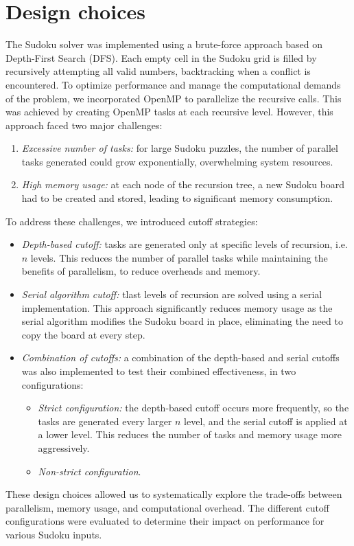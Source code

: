 \documentclass[paper=a4, fontsize=12pt]{scrartcl}
\numberwithin{equation}{section}
\numberwithin{figure}{section}
\numberwithin{table}{section}
\begin{document}
    \section{Design choices}
    The Sudoku solver was implemented using a brute-force approach based on Depth-First Search (DFS). 
    Each empty cell in the Sudoku grid is filled by recursively attempting all valid numbers, backtracking when a conflict is encountered.
    To optimize performance and manage the computational demands of the problem, we incorporated OpenMP to parallelize the recursive calls. 
    This was achieved by creating OpenMP tasks at each recursive level. 
    However, this approach faced two major challenges:
    \begin{enumerate}
        \item \textit{Excessive number of tasks:} for large Sudoku puzzles, the number of parallel tasks generated could grow exponentially, overwhelming system resources.
        \item \textit{High memory usage:} at each node of the recursion tree, a new Sudoku board had to be created and stored, leading to significant memory consumption.
    \end{enumerate}
    \noindent To address these challenges, we introduced cutoff strategies:
    \begin{itemize}
        \item \textit{Depth-based cutoff:} tasks are generated only at specific levels of recursion, i.e. $n$ levels. 
            This reduces the number of parallel tasks while maintaining the benefits of parallelism, to reduce overheads and memory.
        \item \textit{Serial algorithm cutoff:} tlast levels of recursion are solved using a serial implementation. 
            This approach significantly reduces memory usage as the serial algorithm modifies the Sudoku board in place, eliminating the need to copy the board at every step.
        \item \textit{Combination of cutoffs:} a combination of the depth-based and serial cutoffs was also implemented to test their combined effectiveness, in two configurations:
            \begin{itemize}
                \item \textit{Strict configuration:} the depth-based cutoff occurs more frequently, so the tasks are generated every larger $n$ level, and the serial cutoff is applied at a lower level. 
                    This reduces the number of tasks and memory usage more aggressively.
                    \item \textit{Non-strict configuration}.
            \end{itemize}
    \end{itemize}
    These design choices allowed us to systematically explore the trade-offs between parallelism, memory usage, and computational overhead. 
    The different cutoff configurations were evaluated to determine their impact on performance for various Sudoku inputs.
\end{document}
